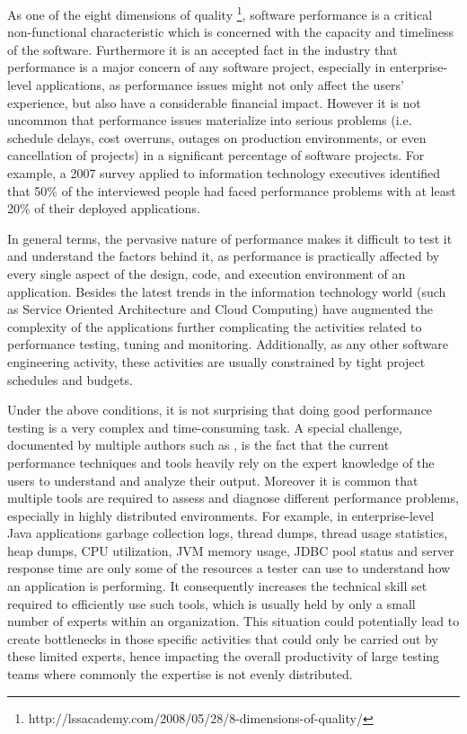 \documentclass[runningheads,a4paper]{llncs}
\begin{document}
As one of the eight dimensions of quality
\footnote{http://lssacademy.com/2008/05/28/8-dimensions-of-quality/}, software
performance is a critical non-functional characteristic which is concerned
with the capacity and timeliness of the software. Furthermore it is an accepted
fact in the industry that performance is a major concern of any software
project, especially in enterprise-level applications, as performance issues
might not only affect the users’ experience, but also have a considerable financial impact. 
However it is not uncommon that performance issues materialize into serious
problems (i.e. schedule delays, cost overruns, outages on production
environments, or even cancellation of projects) in a significant percentage of
software projects. For example, a 2007 survey applied to information technology
executives \cite{Compuware1} identified that 50\% of the interviewed people had
faced performance problems with at least 20\% of their deployed applications.

In general terms, the pervasive nature of performance makes it difficult to
test it and understand the factors behind it, as performance is practically
affected by every single aspect of the design, code, and execution environment of an application.
Besides the latest trends in the information technology world (such as Service Oriented
Architecture and Cloud Computing) have augmented the complexity of the
applications further complicating the activities related to performance testing,
tuning and monitoring. Additionally, as any other software engineering activity,
these activities are usually constrained by tight project schedules and budgets.

Under the above conditions, it is not surprising that doing good performance
testing is a very complex and time-consuming task. A special challenge, documented by 
multiple authors such as \cite{Woodside2007,trevor1,Angelopoulos2012}, is the
fact that the current performance techniques and tools heavily rely on the expert knowledge of the
users to understand and analyze their output. Moreover it is common that
multiple tools are required to assess and diagnose different performance
problems, especially in highly distributed environments. For example, in
enterprise-level Java applications garbage collection logs, thread dumps, 
thread usage statistics, heap dumps, CPU utilization, JVM memory usage, 
JDBC pool status and server response time are only some of the resources a
tester can use to understand how an application is performing. It consequently
increases the technical skill set required to efficiently use such tools, which
is usually held by only a small number of experts within an organization.
This situation could potentially lead to create bottlenecks in those specific
activities that could only be carried out by these limited experts, hence
impacting the overall productivity of large testing teams where commonly the
expertise is not evenly distributed.
\end{document}
